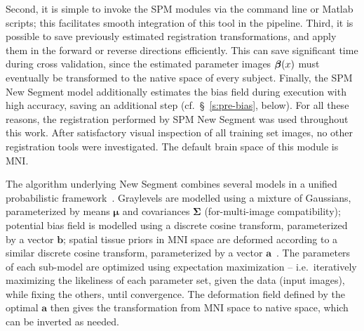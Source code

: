 Second, it is simple to invoke the SPM modules via the command line or Matlab scripts;
this facilitates smooth integration of this tool in the pipeline.
Third, it is possible to save previously estimated registration transformations,
and apply them in the forward or reverse directions efficiently.
This can save significant time during cross validation,
since the estimated parameter images $\bm{\beta}(x)$ must eventually be transformed
to the native space of every subject.
Finally, the SPM New Segment model additionally estimates the bias field during execution
with high accuracy, saving an additional step (cf.~\S~\ref{s:pre-bias}, below). 
For all these reasons, the registration performed by SPM New Segment was used throughout this work.
After satisfactory visual inspection of all training set images,
no other registration tools were investigated.
The default brain space of this module is MNI.
\par
The algorithm underlying New Segment combines several models
in a unified probabilistic framework~\cite{Ashburner2005}.
Graylevels are modelled using a mixture of Gaussians,
parameterized by means $\bm{\mu}$ and covariances $\bm{\Sigma}$ (for-multi-image compatibility);
potential bias field is modelled using a discrete cosine transform,
parameterized by a vector $\bm{b}$;
spatial tissue priors in MNI space are deformed according to a similar discrete cosine transform,
parameterized by a vector $\bm{a}$~\cite{Ashburner1999}.
The parameters of each sub-model are optimized using expectation maximization
-- i.e.\ iteratively maximizing the likeliness of each parameter set,
given the data (input images), while fixing the others, until convergence.
The deformation field defined by the optimal $\bm{a}$ then gives
the transformation from MNI space to native space,
which can be inverted as needed.
